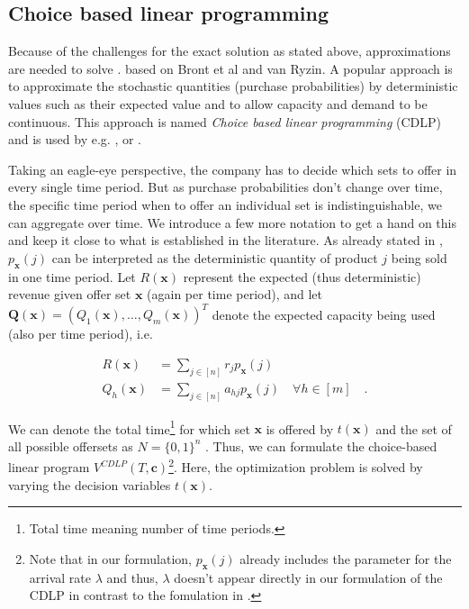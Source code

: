 \subsection{Choice based linear programming}

Because of the challenges for the exact solution as stated above, approximations are needed to solve . based on Bront et al and van Ryzin. A popular approach is to approximate the stochastic quantities (purchase probabilities) by deterministic values such as their expected value and to allow capacity and demand to be continuous. This approach is named \emph{Choice based linear programming} (CDLP) and is used by e.g. \cite{GGallego.}, \cite{Liu.2008} or \cite{Bront.2009}.

Taking an eagle-eye perspective, the company has to decide which sets to offer in every single time period. But as purchase probabilities don't change over time, the specific time period when to offer an individual set is indistinguishable, we can aggregate over time. We introduce a few more notation to get a hand on this and keep it close to what is established in the literature. As already stated in , $p_{\boldsymbol{x}}(j)$ can be interpreted as the deterministic quantity of product $j$ being sold in one time period. Let $R(\mathbf{x})$ represent the expected (thus deterministic) revenue given offer set $\boldsymbol{x}$ (again per time period), and let $\boldsymbol{Q}(\boldsymbol{x}) = (Q_1(\boldsymbol{x}), \dots, Q_m(\boldsymbol{x}))^T$ denote the expected capacity being used (also per time period), i.e.

\begin{align}
R(\boldsymbol{x}) &= \sum_{j \in [n]} r_j p_{\boldsymbol{x}}(j)\\
Q_h(\boldsymbol{x}) &= \sum_{j \in [n]} a_{hj} p_{\boldsymbol{x}}(j) \quad \forall h \in [m]\quad.
\end{align}

We can denote the total time\footnote{Total time meaning number of time periods.} for which set $\boldsymbol{x}$ is offered by $t(\boldsymbol{x})$ and the set of all possible offersets as $N = \{0,1\}^n$ . Thus, we can formulate the choice-based linear program $V^{CDLP}(T, \boldsymbol{c})$\footnote{Note that in our formulation, $p_{\boldsymbol{x}}(j)$ already includes the parameter for the arrival rate $\lambda$ and thus, $\lambda$ doesn't appear directly in our formulation of the CDLP in contrast to the fomulation in \cite{Bront.2009}.}. Here, the optimization problem is solved by varying the decision variables $t(\boldsymbol{x})$. 

